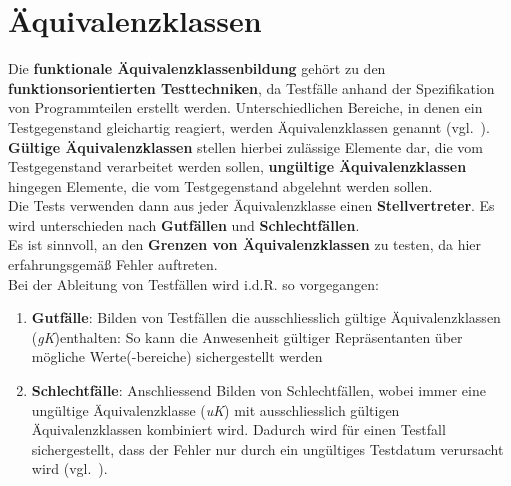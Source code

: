 \section{Äquivalenzklassen}


\begin{tcolorbox}[title=Äquivalenzklassen]
    Die \textbf{funktionale Äquivalenzklassenbildung} gehört zu den \textbf{funktionsorientierten Testtechniken}, da Testfälle anhand der Spezifikation von Programmteilen erstellt werden. Unterschiedlichen Bereiche, in denen ein Testgegenstand gleichartig reagiert, werden Äquivalenzklassen genannt (vgl.~\cite[43]{Wed09c}).\\
    \textbf{Gültige Äquivalenzklassen} stellen hierbei zulässige Elemente dar, die vom Testgegenstand verarbeitet werden sollen, \textbf{ungültige Äquivalenzklassen} hingegen Elemente, die vom Testgegenstand abgelehnt werden sollen.\\

    \noindent
    Die Tests verwenden dann aus jeder Äquivalenzklasse einen \textbf{Stellvertreter}.
    Es wird unterschieden nach \textbf{Gutfällen} und \textbf{Schlechtfällen}.\\
    Es ist sinnvoll, an den \textbf{Grenzen von Äquivalenzklassen} zu testen, da hier erfahrungsgemäß Fehler auftreten.\\

    \noindent
    Bei der Ableitung von Testfällen wird i.d.R. so vorgegangen:
    \begin{enumerate}
        \item \textbf{Gutfälle}: Bilden von Testfällen die ausschliesslich gültige Äquivalenzklassen (\textit{gK})enthalten: So kann die Anwesenheit gültiger Repräsentanten über mögliche Werte(-bereiche) sichergestellt werden
        \item \textbf{Schlechtfälle}: Anschliessend Bilden von Schlechtfällen, wobei immer eine ungültige Äquivalenzklasse (\textit{uK}) mit ausschliesslich gültigen Äquivalenzklassen kombiniert wird.
        Dadurch wird für einen Testfall sichergestellt, dass der Fehler nur durch ein ungültiges Testdatum verursacht wird (vgl.~\cite[55 f.]{Lig09b}).
    \end{enumerate}


\end{tcolorbox}
